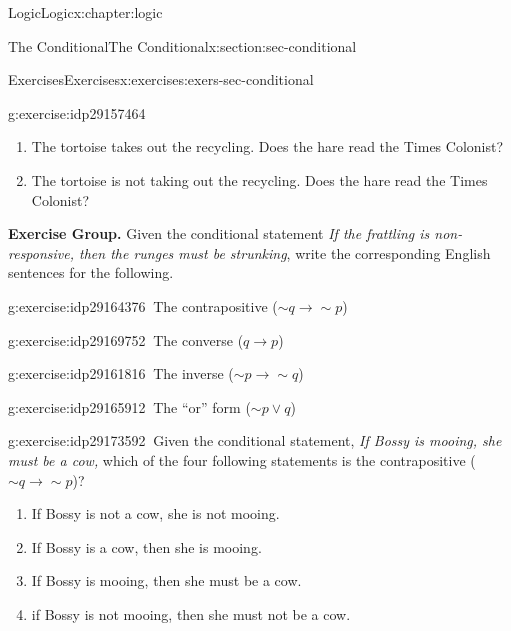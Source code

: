 \documentclass[twoside,10pt,]{book}
\numberwithin{equation}{section}
\newcommand{\inverse}{{\sim\!{p}{} {\rightarrow} \sim\!{q}{}}}
\newcommand{\converse}{{q {\rightarrow} p}}
\newcommand{\contrapositive}{{\sim\!{q}{} {\rightarrow} \sim\!{p}{}}}
\begin{document}
\begin{chapterptx}{Logic}{}{Logic}{}{}{x:chapter:logic}
\begin{sectionptx}{The Conditional}{}{The Conditional}{}{}{x:section:sec-conditional}
\begin{exercises-subsection}{Exercises}{}{Exercises}{}{}{x:exercises:exers-sec-conditional}
\begin{exercisegroup}
\begin{divisionexerciseeg}{22}{}{}{g:exercise:idp29157464}
\begin{enumerate}[label=(\alph*)]
\item{}The tortoise takes out the recycling.  Does the hare read the Times Colonist?%
\item{}The tortoise is not taking out the recycling.  Does the hare read the Times Colonist?%
\end{enumerate}
\end{divisionexerciseeg}%
\end{exercisegroup}
\par\medskip\noindent
\par\medskip\noindent%
\textbf{Exercise Group.}\space\space%
Given the conditional statement \emph{If the frattling is non-responsive, then the runges must be strunking}, write the corresponding English sentences for the following.\begin{exercisegroup}
\begin{divisionexerciseeg}{23}{}{}{g:exercise:idp29164376}%
\(\ \)The contrapositive (\(\contrapositive\))\end{divisionexerciseeg}%
\begin{divisionexerciseeg}{24}{}{}{g:exercise:idp29169752}%
\(\ \)The converse (\(\converse\))\end{divisionexerciseeg}%
\begin{divisionexerciseeg}{25}{}{}{g:exercise:idp29161816}%
\(\ \)The inverse (\(\inverse\))\end{divisionexerciseeg}%
\begin{divisionexerciseeg}{26}{}{}{g:exercise:idp29165912}%
\(\ \)The ``or'' form (\(\sim\!{p}{\vee} q\))\end{divisionexerciseeg}%
\end{exercisegroup}
\par\medskip\noindent
\begin{divisionexercise}{27}{}{}{g:exercise:idp29173592}%
\(\ \)Given the conditional statement, \emph{If Bossy is mooing, she must be a cow,} which of the four following statements is the contrapositive (\(\contrapositive\))? %
\begin{enumerate}[label=(\alph*)]
\item{}If Bossy is not a cow, she is not mooing.%
\item{}If Bossy is a cow, then she is mooing.%
\item{}If Bossy is mooing, then she must be a cow.%
\item{}if Bossy is not mooing, then she must not be a cow.%
\end{enumerate}
\end{divisionexercise}%

\end{exercises-subsection}
\end{sectionptx}
\end{chapterptx}
\end{document}
